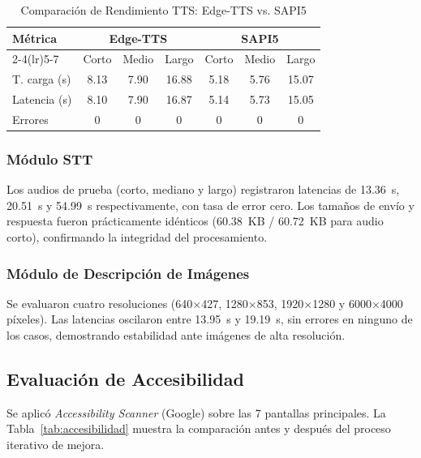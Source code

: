 \documentclass[journal]{IEEEtran}
\begin{document}
\begin{table}[!t]
\caption{Comparaci\'on de Rendimiento TTS: Edge-TTS vs. SAPI5}
\label{tab:tts}
\centering
\small
\renewcommand{\arraystretch}{1.2}
\begin{tabular}{lcccccc}
\toprule
\multirow{2}{*}{\textbf{M\'etrica}} & \multicolumn{3}{c}{\textbf{Edge-TTS}} & \multicolumn{3}{c}{\textbf{SAPI5}} \\
\cmidrule(lr){2-4}\cmidrule(lr){5-7}
 & Corto & Medio & Largo & Corto & Medio & Largo \\
\midrule
T. carga (s)   & 8.13 & 7.90 & 16.88 & 5.18 & 5.76 & 15.07 \\
Latencia (s)   & 8.10 & 7.90 & 16.87 & 5.14 & 5.73 & 15.05 \\
Errores        & 0 & 0 & 0 & 0 & 0 & 0 \\
\bottomrule
\end{tabular}
\end{table}

\subsubsection{M\'odulo STT}

Los audios de prueba (corto, mediano y largo) registraron latencias de 13.36~s, 20.51~s y 54.99~s respectivamente, con tasa de error cero. Los tama\~nos de env\'io y respuesta fueron pr\'acticamente id\'enticos (60.38~KB / 60.72~KB para audio corto), confirmando la integridad del procesamiento.

\subsubsection{M\'odulo de Descripci\'on de Im\'agenes}

Se evaluaron cuatro resoluciones (640$\times$427, 1280$\times$853, 1920$\times$1280 y 6000$\times$4000 p\'ixeles). Las latencias oscilaron entre 13.95~s y 19.19~s, sin errores en ninguno de los casos, demostrando estabilidad ante im\'agenes de alta resoluci\'on.

\subsection{Evaluaci\'on de Accesibilidad}

Se aplic\'o \textit{Accessibility Scanner} (Google) sobre las 7 pantallas principales. La Tabla~\ref{tab:accesibilidad} muestra la comparaci\'on antes y despu\'es del proceso iterativo de mejora.
\end{document}
